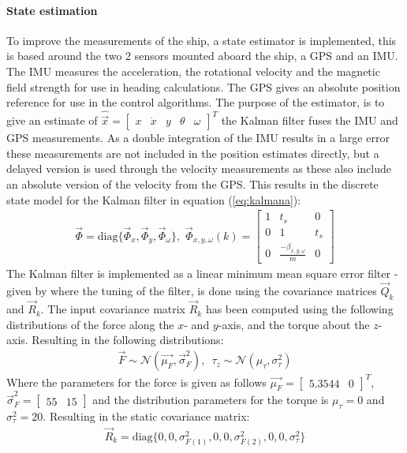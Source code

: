\documentclass[a0,portrait]{a0poster}
\begin{document}
\begin{center}
{\paragraph{State estimation}
To improve the measurements of the ship, a state estimator is implemented, this is based around the two 2 sensors mounted aboard the ship, a GPS and an IMU. The IMU measures the acceleration, the rotational velocity and the magnetic field strength for use in heading calculations. The GPS gives an absolute position reference for use in the control algorithms. The purpose of the estimator, is to give an estimate of $\hat{\vec{x}} = \begin{bmatrix}x & \dot{x} & y & \theta & \omega\end{bmatrix}^T$ the Kalman filter fuses the IMU and GPS measurements. As a double integration of the IMU results in a large error these measurements are not included in the position estimates directly, but a delayed version is used through the velocity measurements as these also include an absolute version of the velocity from the GPS. This results in the discrete state model for the Kalman filter in equation (\ref{eq:kalmana}):
\begin{align}
\vec{\Phi} = \text{diag}\{\vec{\Phi} _x,\vec{\Phi} _y,\vec{\Phi} _\omega\},\,\, \vec{\Phi}_{x,y,\omega}(k) = \begin{bmatrix}
1 & t_s & 0\\
0 & 1 & t_s\\
0 & \frac{-\beta_{x,y,\omega}}{m} & 0
\end{bmatrix}
\label{eq:kalmana}
\end{align}
The Kalman filter is implemented as a linear minimum mean square error filter - given by \cite{grewal} where the tuning of the filter, is done using the covariance matrices $\vec{Q}_k$ and $\vec{R}_k$. The input covariance matrix $\vec{R}_k$ has been computed using the following distributions of the force along the $x$- and $y$-axis, and the torque about the $z$-axis. Resulting in the following distributions:
\begin{align}
\vec{F} \sim \mathcal{N}(\vec{\mu_F},\vec{\sigma}^2_F),\,\,\, \tau_z \sim \mathcal{N}(\mu_{\tau},\sigma^2_{\tau})
\end{align}
Where the parameters for the force is given as follows $\vec{\mu_F} = \begin{bmatrix}5.3544 & 0\end{bmatrix}^T$, $\vec{\sigma}^2_F = \begin{bmatrix}55 & 15\end{bmatrix}$ and the distribution parameters for the torque is $\mu_{\tau} = 0$ and $\sigma^2_{\tau} = 20$. Resulting in the static covariance matrix:
\begin{align}
\vec{R}_k = \text{diag}\{0,0,\sigma^2_{F(1)},0,0,\sigma^2_{F(2)},0,0,\sigma^2_\tau\}
\end{align}
}
\col{
}
\end{center}
\end{document}
